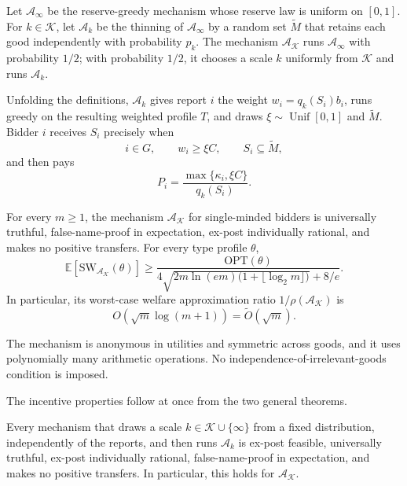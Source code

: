 \documentclass[format=acmsmall, review=false]{acmart}
\newcommand{\E}{\mathbb{E}}
\newcommand{\OPT}{\mathrm{OPT}}
\newcommand{\SW}{\mathrm{SW}}
\begin{document}
\begin{definition}
\label{def:M}
Let \(\mathcal A_\infty\) be the reserve-greedy mechanism whose
reserve law is uniform on \([0,1]\). For \(k\in\mathcal K\), let
\(\mathcal A_k\) be the thinning of \(\mathcal A_\infty\) by a
random set \(\widetilde M\) that retains each good independently
with probability \(p_k\). The mechanism
\(\mathcal A_{\mathcal K}\) runs \(\mathcal A_\infty\) with
probability \(1/2\); with probability \(1/2\), it chooses a
scale \(k\) uniformly from \(\mathcal K\) and runs
\(\mathcal A_k\).
\end{definition}

Unfolding the definitions, \(\mathcal A_k\) gives report \(i\)
the weight \(w_i=q_k(S_i)b_i\), runs greedy on the resulting
weighted profile \(T\), and draws
\(\xi\sim\operatorname{Unif}[0,1]\) and \(\widetilde M\). Bidder
\(i\) receives \(S_i\) precisely when
\[
i\in G,\qquad w_i\ge\xi C,\qquad S_i\subseteq\widetilde M,
\]
and then pays
\begin{equation}\label{eq:actual-payment}
P_i=\frac{\max\{\kappa_i,\xi C\}}{q_k(S_i)}.
\end{equation}

\begin{theorem}\label{thm:main}
For every \(m\ge1\), the mechanism \(\mathcal A_{\mathcal K}\)
for single-minded bidders is universally truthful,
false-name-proof in expectation, ex-post individually rational,
and makes no positive transfers. For every type profile
\(\theta\),
\[
\E[\SW_{\mathcal A_{\mathcal K}}(\theta)]
\ge
\frac{\OPT(\theta)}{
4\sqrt{2m\ln(em)\bigl(1+\lfloor\log_2m\rfloor\bigr)}+8/e}.
\]
In particular, its worst-case welfare approximation ratio
\(1/\rho(\mathcal A_{\mathcal K})\) is
\[
O(\sqrt m\log(m+1))=\widetilde O(\sqrt m).
\]

The mechanism is anonymous in utilities and symmetric across
goods, and it uses polynomially many arithmetic operations. No
independence-of-irrelevant-goods condition is imposed.
\end{theorem}

The incentive properties follow at once from the two general
theorems.

\begin{corollary}\label{cor:mixture}
Every mechanism that draws a scale
\(k\in\mathcal K\cup\{\infty\}\) from a fixed distribution,
independently of the reports, and then runs \(\mathcal A_k\) is
ex-post feasible, universally truthful, ex-post individually
rational, false-name-proof in expectation, and makes no positive
transfers. In particular, this holds for
\(\mathcal A_{\mathcal K}\).
\end{corollary}
\end{document}
